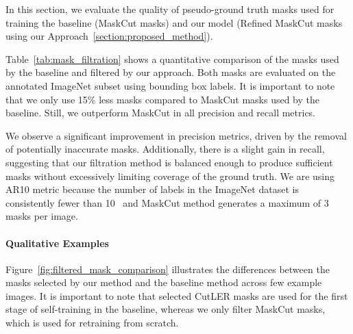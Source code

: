 \begin{table}[htbp]
	\centering
	\caption[\textbf{Quantitative Comparison of CutLER vs Proposed Mask Filtration Methods}]{\textbf{Quantitative Comparison of CutLER vs Our Proposed Filtration Methods} evaluated on annotated ImageNet subset using bounding box labels.}
	\label{tab:mask_filtration}
\end{table}

In this section, we evaluate the quality of pseudo-ground truth masks used for training the baseline (MaskCut masks) and our model (Refined MaskCut masks using our Approach~\ref{section:proposed_method}).

Table~\ref{tab:mask_filtration} shows a quantitative comparison of the masks used by the baseline and filtered by our approach. Both masks are evaluated on the annotated ImageNet subset using bounding box labels. It is important to note that we only use 15\% less masks compared to MaskCut masks used by the baseline. Still, we outperform MaskCut in all precision and recall metrics. 

We observe a significant improvement in precision metrics, driven by the removal of potentially inaccurate masks. Additionally, there is a slight gain in recall, suggesting that our filtration method is balanced enough to produce sufficient masks without excessively limiting coverage of the ground truth. We are using AR10 metric because the number of labels in the ImageNet dataset is consistently fewer than 10~\cite{deng2009imagenet} and MaskCut method generates a maximum of 3 masks per image.

\paragraph{Qualitative Examples}
Figure~\ref{fig:filtered_mask_comparison} illustrates the differences between the masks selected by our method and the baseline method across few example images. It is important to note that selected CutLER masks are used for the first stage of self-training in the baseline, whereas we only filter MaskCut masks, which is used for retraining from scratch.


